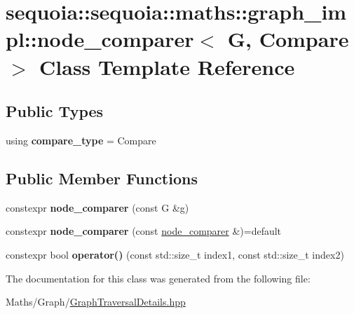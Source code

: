 \hypertarget{classsequoia_1_1sequoia_1_1maths_1_1graph__impl_1_1node__comparer}{}\section{sequoia\+::sequoia\+::maths\+::graph\+\_\+impl\+::node\+\_\+comparer$<$ G, Compare $>$ Class Template Reference}
\label{classsequoia_1_1sequoia_1_1maths_1_1graph__impl_1_1node__comparer}
\subsection*{Public Types}
\begin{DoxyCompactItemize}
\item 
\mbox{\label{classsequoia_1_1sequoia_1_1maths_1_1graph__impl_1_1node__comparer_a2e3b5e28e0cd70db8c4e584606ebee39}} 
using {\bfseries compare\+\_\+type} = Compare
\end{DoxyCompactItemize}
\subsection*{Public Member Functions}
\begin{DoxyCompactItemize}
\item 
\mbox{\label{classsequoia_1_1sequoia_1_1maths_1_1graph__impl_1_1node__comparer_a2e537aaa036e3e2d1ea5656e1f932b8b}} 
constexpr {\bfseries node\+\_\+comparer} (const G \&g)
\item 
\mbox{\label{classsequoia_1_1sequoia_1_1maths_1_1graph__impl_1_1node__comparer_a3863f2255d5d6c0f6116e0db45d2bf01}} 
constexpr {\bfseries node\+\_\+comparer} (const \mbox{\hyperlink{classsequoia_1_1sequoia_1_1maths_1_1graph__impl_1_1node__comparer}{node\+\_\+comparer}} \&)=default
\item 
\mbox{\label{classsequoia_1_1sequoia_1_1maths_1_1graph__impl_1_1node__comparer_a8b10c9853bfbd137395dce0f5aaa2566}} 
constexpr bool {\bfseries operator()} (const std\+::size\+\_\+t index1, const std\+::size\+\_\+t index2)
\end{DoxyCompactItemize}


The documentation for this class was generated from the following file\+:\begin{DoxyCompactItemize}
\item 
Maths/\+Graph/\mbox{\hyperlink{_graph_traversal_details_8hpp}{Graph\+Traversal\+Details.\+hpp}}\end{DoxyCompactItemize}
